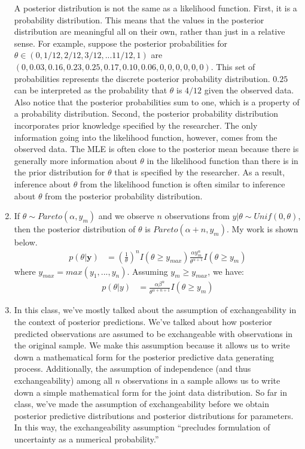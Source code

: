 \documentclass[11pt]{article}\usepackage[]{graphicx}\usepackage[]{color}
\begin{document}
\begin{doublespacing}
\begin{enumerate}
\noindent A posterior distribution is not the same as a likelihood function. First, it is a probability distribution. This means that the values in the posterior distribution are meaningful all on their own, rather than just in a relative sense. For example, suppose the posterior probabilities for $\theta \in (0, 1/12, 2/12, 3/12,...11/12, 1)$ are $(0, 0.03, 0.16, 0.23, 0.25, 0.17, 0.10, 0.06, 0, 0, 0, 0, 0, 0)$. This set of probabilities represents the discrete posterior probability distribution. $0.25$ can be interpreted as the probability that  $\theta$ is $4/12$ given the observed data. Also notice that the posterior probabilities sum to one, which is a property of a probability distribution. Second, the posterior probability distribution incorporates prior knowledge specified by the researcher. The only information going into the likelihood function, however, comes from the observed data. The MLE is often close to the posterior mean because there is generally more information about $\theta$ in the likelihood function than there is in the prior distribution for $\theta$ that is specified by the researcher. As a result, inference about $\theta$ from the likelihood function is often similar to inference about $\theta$ from the posterior probability distribution.

\item If $\theta \sim Pareto(\alpha, y_m)$ and we observe $n$ observations from $y|\theta \sim Unif(0, \theta)$, then the posterior distribution of $\theta$ is $Pareto(\alpha+n, y_m)$. My work is shown below.
\begin{align*}
p(\theta|\mathbf{y}) &= \left(\frac{1}{\theta}\right)^nI(\theta \geq y_{max})\frac{\alpha y_m^{\alpha}}{\theta^{\alpha+1}}I(\theta\geq y_m)
\end{align*}
where $y_{max}=max(y_1,...,y_n)$. Assuming $y_m \geq y_{max}$, we have:
\begin{align*}
p(\theta|y) &= \frac{\alpha\beta^{\alpha}}{\theta^{\alpha+n+1}}I(\theta\geq y_m)
\end{align*}

\item In this class, we've mostly talked about the assumption of exchangeability in the context of posterior predictions. We've talked about how posterior predicted observations are assumed to be exchangeable with observations in the original sample. We make this assumption because it allows us to write down a mathematical form for the posterior predictive data generating process. Additionally, the assumption of independence (and thus exchangeability) among all $n$ observations in a sample allows us to write down a simple mathematical form for the joint data distribution. So far in class, we've made the assumption of exchangeability before we obtain posterior predictive distributions and posterior distributions for parameters. In this way, the exchangeability assumption ``precludes formulation of uncertainty as a numerical probability.'' \\


\end{enumerate}
\end{doublespacing}
\end{document}
